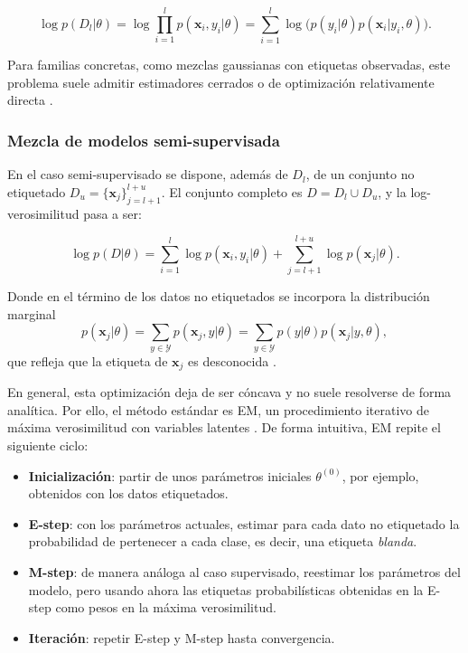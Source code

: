 \begin{equation}
    \log p(D_l|\theta) = \log \prod_{i=1}^{l} p(\mathbf{x}_i, y_i|\theta)
     = \sum_{i=1}^{l} \log \bigl(p(y_i|\theta)p(\mathbf{x}_i|y_i,\theta)\bigr).
\end{equation}

Para familias concretas, como mezclas gaussianas con etiquetas observadas, este problema suele admitir estimadores cerrados o de optimización relativamente directa \cite{zhu2009introduction}.

\subsubsection{Mezcla de modelos semi-supervisada}

En el caso semi-supervisado se dispone, además de $D_l$, de un conjunto no etiquetado $D_u=\{\mathbf{x}_j\}_{j=l+1}^{l+u}$. El conjunto completo es $D=D_l\cup D_u$, y la log-verosimilitud pasa a ser:

\begin{equation}
    \log p(D|\theta) = \sum_{i=1}^{l} \log p(\mathbf{x}_i,y_i|\theta) + \sum_{j=l+1}^{l+u} \log p(\mathbf{x}_j|\theta).
\end{equation}

Donde en el término de los datos no etiquetados se incorpora la distribución marginal
\begin{equation}
    p(\mathbf{x}_j|\theta)=\sum_{y\in\mathcal{Y}} p(\mathbf{x}_j,y|\theta)=\sum_{y\in\mathcal{Y}} p(y|\theta)p(\mathbf{x}_j|y,\theta),
\end{equation}
que refleja que la etiqueta de $\mathbf{x}_j$ es desconocida \cite{zhu2009introduction}.

En general, esta optimización deja de ser cóncava y no suele resolverse de forma analítica. Por ello, el método estándar es \gls{EM}, un procedimiento iterativo de máxima verosimilitud con variables latentes \cite{dempster1977maximum}. De forma intuitiva, \gls{EM} repite el siguiente ciclo:
\begin{itemize}
    \item \textbf{Inicialización}: partir de unos parámetros iniciales $\theta^{(0)}$, por ejemplo, obtenidos con los datos etiquetados.
    \item \textbf{E-step}: con los parámetros actuales, estimar para cada dato no etiquetado la probabilidad de pertenecer a cada clase, es decir, una etiqueta \textit{blanda}.
    \item \textbf{M-step}: de manera análoga al caso supervisado, reestimar los parámetros del modelo, pero usando ahora las etiquetas probabilísticas obtenidas en la E-step como pesos en la máxima verosimilitud.
    \item \textbf{Iteración}: repetir E-step y M-step hasta convergencia.
\end{itemize}

